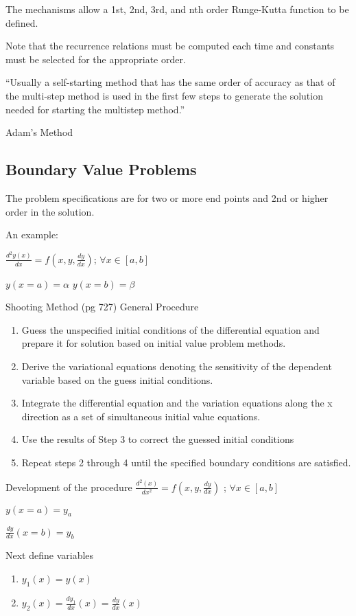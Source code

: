 \documentclass[11pt]{article}
\begin{document}
The mechanisms allow a 1st, 2nd, 3rd, and nth order Runge-Kutta function to be defined.  

Note that the recurrence relations must be computed each time and constants must be selected for the appropriate order.

``Usually a self-starting method that has the same order of accuracy as that of the multi-step method is used in the first few steps to generate the solution needed for starting the multistep method.'' 

Adam's Method 

\subsection {Boundary Value Problems}
The problem specifications are for two or more end points and 2nd or higher order in the solution.  

An example:

$ \frac {d^2 y (x)} {d x} = f(x,y, \frac{dy}{dx}) $;  $\forall x \in [a,b]$

$ y (x =a) = \alpha $
$ y (x =b) = \beta $

Shooting Method (pg 727)  General Procedure
\begin{enumerate}
\item Guess the unspecified initial conditions of the differential equation and prepare it for solution based on initial value problem methods.
\item Derive the variational equations denoting the sensitivity of the dependent variable based on the guess initial conditions.
\item Integrate the differential equation and the variation equations along the x direction as a set of simultaneous initial value equations.
\item Use the results of Step 3 to correct the guessed initial conditions
\item Repeat steps 2 through 4 until the specified boundary conditions are satisfied.  
\end{enumerate}

Development of the procedure $\frac{d^2 (x)}{dx^2} = f(x,y,\frac{dy}{dx} )$ ; $\forall x \in [a,b]$

$y(x=a) = y_a$

$\frac {dy}{dx} (x= b) = y_b$

Next define variables 
\begin{enumerate}
\item $y_1 (x) = y(x) $
\item $y_2 (x) = \frac{dy_1}{dx}(x) = \frac{dy}{dx}(x) $
\end{enumerate}
\end{document}
